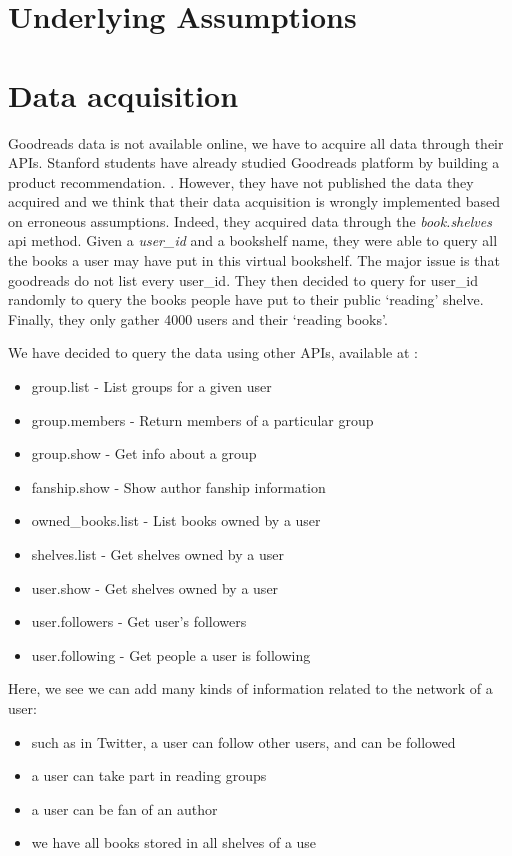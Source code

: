 \documentclass[11pt]{article}
\begin{document}
\section{Underlying Assumptions}
\section{Data acquisition}

Goodreads data is not available online, we have to acquire all data through their APIs. Stanford students have already studied Goodreads platform by building a product recommendation. \cite{stanford:goodreads}. However, they have not published the data they acquired and we think that their data acquisition is wrongly implemented based on erroneous assumptions. Indeed, they acquired data through the \textit{book.shelves} api method. Given a \textit{user\_id} and a bookshelf name, they were able to query all the books a user may have put in this virtual bookshelf. The major issue is that goodreads do not list every user\_id. They then decided to query for user\_id randomly to query the books people have put to their public `reading' shelve. Finally, they only gather 4000 users and their `reading books'.

We have decided to query the data using other APIs, available at \cite{goodreads:api}:
\begin{itemize}
\item group.list - List groups for a given user
\item group.members - Return members of a particular group
\item group.show - Get info about a group
\item fanship.show - Show author fanship information
\item owned\_books.list - List books owned by a user
\item shelves.list - Get shelves owned by a user
\item user.show - Get shelves owned by a user
\item user.followers - Get user's followers
\item user.following - Get people a user is following
\end{itemize}

Here, we see we can add many kinds of information related to the network of a user:
\begin{itemize}
\item such as in Twitter, a user can follow other users, and can be followed
\item a user can take part in reading groups
\item a user can be fan of an author
\item we have all books stored in all shelves of a use
\end{itemize}
\end{document}
